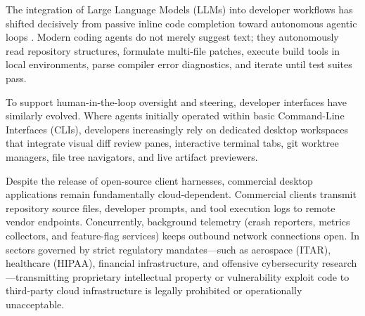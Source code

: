 \documentclass[11pt]{article}
\begin{document}
The integration of Large Language Models (LLMs) into developer workflows has shifted decisively from passive
inline code completion toward autonomous agentic loops \cite{yao2023react,yang2024sweagent,wang2024openhands,jimenez2024swebench}.
Modern coding agents do not merely suggest text; they autonomously read repository structures, formulate multi-file
patches, execute build tools in local environments, parse compiler error diagnostics, and iterate until test
suites pass.

To support human-in-the-loop oversight and steering, developer interfaces have similarly evolved. Where agents
initially operated within basic Command-Line Interfaces (CLIs), developers increasingly rely on dedicated desktop
workspaces that integrate visual diff review panes, interactive terminal tabs, git worktree managers, file tree
navigators, and live artifact previewers.

Despite the release of open-source client harnesses, commercial desktop applications remain fundamentally
cloud-dependent. Commercial clients transmit repository source files, developer prompts, and tool execution
logs to remote vendor endpoints. Concurrently, background telemetry (crash reporters, metrics collectors, and
feature-flag services) keeps outbound network connections open. In sectors
governed by strict regulatory mandates—such as aerospace (ITAR), healthcare (HIPAA), financial infrastructure,
and offensive cybersecurity research—transmitting proprietary intellectual property or vulnerability exploit
code to third-party cloud infrastructure is legally prohibited or operationally unacceptable.
\end{document}
